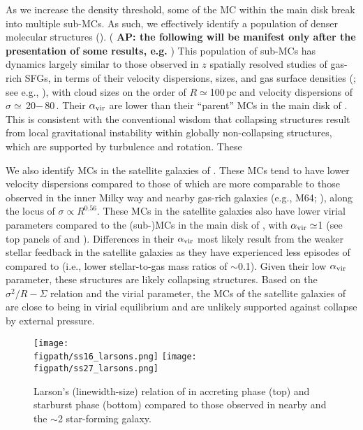 \documentclass[iop]{emulateapj} %
\newcommand{\AP}[1]{({\bf \color{apcolor} AP: #1})}
\begin{document}
As we increase the density threshold, some of the MC within the main disk break
into multiple sub-MCs.
As such, we effectively identify a population of denser molecular structures  ().
\AP{the following will be manifest only after the presentation of some results, e.g. \Fig{alpha16}}
This population of sub-MCs has dynamics largely
similar to those observed
in $z$ spatially resolved studies of gas-rich SFGs, in
terms of their velocity dispersions, sizes, and gas surface densities (; see
e.g., \citealt{Swinbank11a}),
with cloud sizes on the order of $R\simeq$100\,pc and velocity
dispersions of $\sigma\simeq$\,20$-$\,80\,\kms. Their $\alpha_{\rm vir}$
are lower than their ``parent'' MCs in the main disk of \flower. This is consistent with
the conventional wisdom that collapsing structures result from local gravitational
instability within globally non-collapsing structures,
which are supported by turbulence and rotation.
These 

We also identify MCs in the satellite galaxies of \flower. These MCs
tend to have lower velocity dispersions compared to those of \flower which are more comparable
to those observed in the inner Milky way and
nearby gas-rich galaxies (e.g., M64; \citealt{Oka01a, Rosolowsky05a, Heyer09a}),
along the locus of $\sigma\propto R^{0.56}$.
These MCs in the satellite galaxies also have
lower virial parameters compared to the (sub-)MCs in the main disk of \flower,
with $\alpha_{\rm vir}\simeq$1 (see top panels of  and ).
Differences in their $\alpha_{\rm vir}$ most likely result from the weaker
stellar feedback in the satellite galaxies as they have experienced less episodes of \SF compared to
\flower (i.e., lower stellar-to-gas mass ratios of $\sim$0.1). Given their low $\alpha_{\rm vir}$ parameter,
these structures are likely collapsing structures.
Based on the $\sigma^2/R - \Sigma$ relation and the virial parameter,
the MCs of the satellite galaxies of
\flower are close to being in virial equilibrium and are unlikely supported against collapse by external pressure. 


\begin{figure*}[htbp]
\centering
\texttt{[image: \\figpath/ss16\_larsons.png]}
\texttt{[image: \\figpath/ss27\_larsons.png]}
\caption{
Larson's (linewidth-size) relation of \flower in
accreting phase (top) and
starburst phase (bottom) compared to
those observed in nearby and the \z$\sim$2 star-forming galaxy.
\label{fig:larsons_single}}
\end{figure*}
\end{document}

